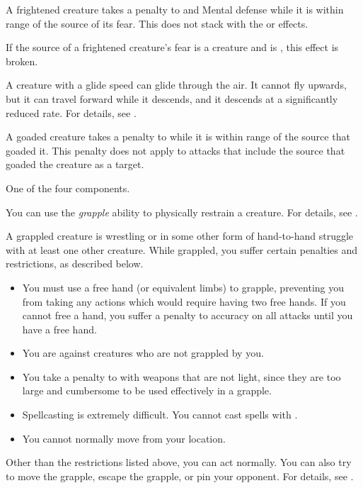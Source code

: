  A frightened creature takes a  penalty to  and Mental defense while it is within \rngmed range of the source of its fear.
This does not stack with the  or  effects.

If the source of a frightened creature's fear is a creature and is , this effect is broken.

 A creature with a glide speed can glide through the air.
It cannot fly upwards, but it can travel forward while it descends, and it descends at a significantly reduced rate.
For details, see .

 A goaded creature takes a  penalty to  while it is within \rngclose range of the source that goaded it.
This penalty does not apply to attacks that include the source that goaded the creature as a target.

 One of the four  components.

 You can use the \textit{grapple} ability to physically restrain a creature.
For details, see .

 A grappled creature is wrestling or in some other form of hand-to-hand struggle with at least one other creature.
While grappled, you suffer certain penalties and restrictions, as described below.
\begin{itemize}
    \item You must use a free hand (or equivalent limbs) to grapple, preventing you from taking any actions which would require having two free hands.
        If you cannot free a hand, you suffer a  penalty to accuracy on all  attacks until you have a free hand.
    \item You are  against creatures who are not grappled by you.
    \item You take a  penalty to  with weapons that are not light, since they are too large and cumbersome to be used effectively in a grapple.
    \item Spellcasting is extremely difficult. You cannot cast spells with .
    \item You cannot normally move from your location. 
\end{itemize}

Other than the restrictions listed above, you can act normally. You can also try to move the grapple, escape the grapple, or pin your opponent. For details, see .

